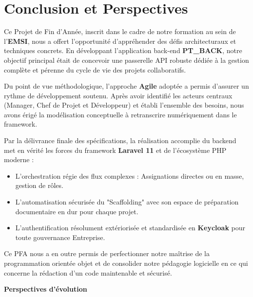 \chapter*{Conclusion et Perspectives}
\thispagestyle{fancy}

Ce Projet de Fin d'Ann\'{e}e, inscrit dans le cadre de notre formation au sein de
l'\textbf{EMSI}, nous a offert l'opportunit\'{e} d'appr\'{e}hender des d\'{e}fis architecturaux et
techniques concrets. En d\'{e}veloppant l'application back-end \textbf{PT\_BACK}, notre
objectif principal \'{e}tait de concevoir une passerelle API robuste d\'{e}di\'{e}e \`{a} la gestion
compl\`{e}te et p\'{e}renne du cycle de vie des projets collaboratifs.

Du point de vue m\'{e}thodologique, l'approche \textbf{Agile} adopt\'{e}e a permis d'assurer un
rythme de d\'{e}veloppement soutenu. Apr\`{e}s avoir identifi\'{e} les acteurs centraux
(Manager, Chef de Projet et D\'{e}veloppeur) et \'{e}tabli l'ensemble des besoins,
nous avons \'{e}rig\'{e} la mod\'{e}lisation conceptuelle \`{a} retranscrire num\'{e}riquement dans le
framework.

Par la d\'{e}livrance finale des sp\'{e}cifications, la r\'{e}alisation accomplie du
backend met en v\'{e}rit\'{e} les forces du framework \textbf{Laravel 11} et de l'\'{e}cosyst\`{e}me PHP moderne :
\begin{itemize}[leftmargin=*, label=\textcolor{emsiRed}{}]
    \item L'orchestration r\'{e}gie des flux complexes : Assignations directes ou en masse,
    gestion de rôles.
    \item L'automatisation s\'{e}curis\'{e}e du "Scaffolding" avec son espace de pr\'{e}paration documentaire en dur pour chaque projet.
    \item L'authentification r\'{e}solument ext\'{e}rioris\'{e}e et standardis\'{e}e en \textbf{Keycloak} pour
    toute gouvernance Entreprise.
\end{itemize}

Ce PFA nous a en outre permis de perfectionner notre ma\^{i}trise de la programmation
orient\'{e}e objet et de consolider notre p\'{e}dagogie logicielle en ce qui concerne la r\'{e}daction d'un
code maintenable et s\'{e}curis\'{e}.

\vspace{0.8cm}
\noindent\textcolor{emsiDark}{\Large\bfseries Perspectives d'\'{e}volution}


